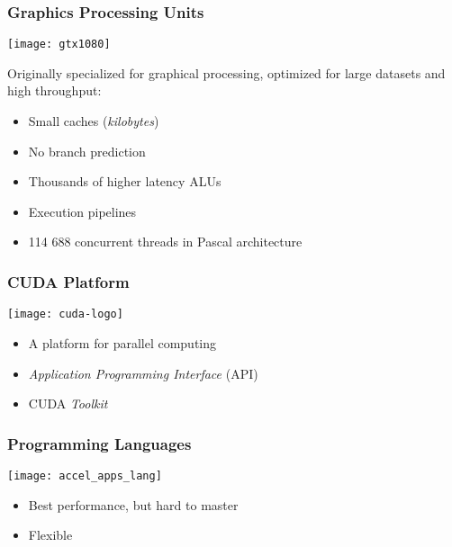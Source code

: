 \documentclass[10pt, compress]{beamer}
\begin{document}
\begin{frame}
    \frametitle{Graphics Processing Units}
    \begin{center}
        \texttt{[image: gtx1080]}
    \end{center}


    Originally specialized for \alert{graphical processing},
    optimized for large datasets and \alert{high throughput}:

    \begin{itemize}
        \item Small caches (\textit{kilobytes})
        \item No \alert{branch prediction}
        \item Thousands of \alert{higher latency} ALUs
        \item Execution \alert{pipelines}
        \item 114 688 concurrent \alert{threads} in Pascal architecture
    \end{itemize}
\end{frame}

\begin{frame}
    \frametitle{CUDA Platform}
    \begin{center}
        \texttt{[image: cuda-logo]}
    \end{center}

    \begin{itemize}
        \item A platform for \alert{parallel computing}
        \item \textit{Application Programming Interface} (API)
        \item CUDA \textit{Toolkit}
    \end{itemize}
\end{frame}

\begin{frame}
    \frametitle{Programming Languages}
    \begin{center}
        \texttt{[image: accel\_apps\_lang]}
    \end{center}

    \begin{itemize}
        \item Best performance, but hard to master
        \item Flexible
    \end{itemize}
\end{frame}
\end{document}
